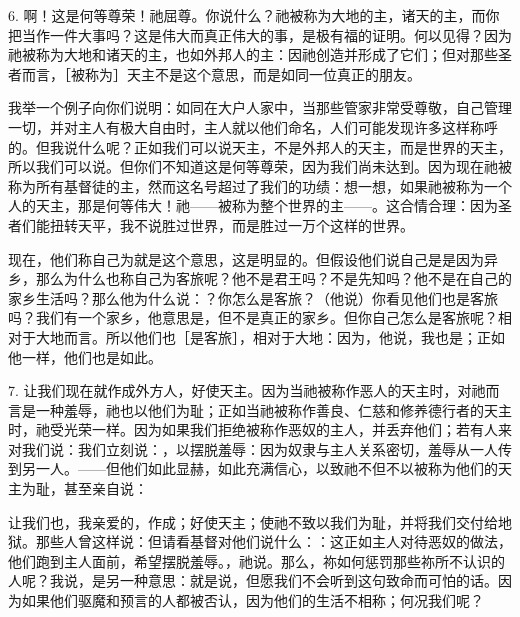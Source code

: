 6. 啊！这是何等尊荣！祂屈尊。你说什么？祂被称为大地的主，诸天的主，而你把当作一件大事吗？这是伟大而真正伟大的事，是极有福的证明。何以见得？因为祂被称为大地和诸天的主，也如外邦人的主：因祂创造并形成了它们；但对那些圣者而言，［被称为］天主不是这个意思，而是如同一位真正的朋友。\par

我举一个例子向你们说明：如同在大户人家中，当那些管家非常受尊敬，自己管理一切，并对主人有极大自由时，主人就以他们命名，人们可能发现许多这样称呼的。但我说什么呢？正如我们可以说天主，不是外邦人的天主，而是世界的天主，所以我们可以说。但你们不知道这是何等尊荣，因为我们尚未达到。因为现在祂被称为所有基督徒的主，然而这名号超过了我们的功绩：想一想，如果祂被称为一个人的天主，那是何等伟大！祂——被称为整个世界的主——。这合情合理：因为圣者们能扭转天平，我不说胜过世界，而是胜过一万个这样的世界。\par

现在，他们称自己为就是这个意思，这是明显的。但假设他们说自己是是因为异乡，那么为什么也称自己为客旅呢？他不是君王吗？不是先知吗？他不是在自己的家乡生活吗？那么他为什么说：？你怎么是客旅？（他说）你看见他们也是客旅吗？我们有一个家乡，他意思是，但不是真正的家乡。但你自己怎么是客旅呢？相对于大地而言。所以他们也［是客旅］，相对于大地：因为，他说，我也是；正如他一样，他们也是如此。\par

7. 让我们现在就作成外方人，好使天主。因为当祂被称作恶人的天主时，对祂而言是一种羞辱，祂也以他们为耻；正如当祂被称作善良、仁慈和修养德行者的天主时，祂受光荣一样。因为如果我们拒绝被称作恶奴的主人，并丢弃他们；若有人来对我们说：我们立刻说：，以摆脱羞辱：因为奴隶与主人关系密切，羞辱从一人传到另一人。——但他们如此显赫，如此充满信心，以致祂不但不以被称为他们的天主为耻，甚至亲自说：\par

让我们也，我亲爱的，作成；好使天主；使祂不致以我们为耻，并将我们交付给地狱。那些人曾这样说：但请看基督对他们说什么：：这正如主人对待恶奴的做法，他们跑到主人面前，希望摆脱羞辱。，祂说。那么，祢如何惩罚那些祢所不认识的人呢？我说，是另一种意思：就是说，但愿我们不会听到这句致命而可怕的话。因为如果他们驱魔和预言的人都被否认，因为他们的生活不相称；何况我们呢？\par

